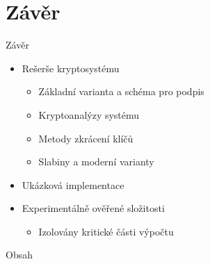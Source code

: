 \documentclass{beamer}
\begin{document}
\section{Závěr}

\begin{frame}{Závěr}

        \pause

    \begin{itemize}
        \item Rešerše kryptosystému
            \begin{itemize}
                \item Základní varianta a schéma pro podpis
                \item Kryptoanalýzy systému
                \item Metody zkrácení klíčů
                \item Slabiny a moderní varianty
            \end{itemize}

            \pause
        \item Ukázková implementace

            \pause
        \item Experimentálně ověřené složitosti
            \begin{itemize}
                \item Izolovány kritické části výpočtu
            \end{itemize}

    \end{itemize}
\end{frame}

\begin{frame}{Obsah}
    \tableofcontents
\end{frame}


\appendix
\end{document}
